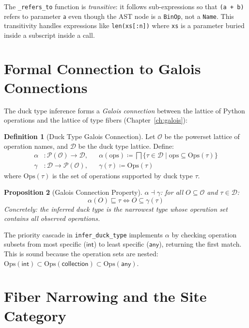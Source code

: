 \documentclass[11pt,a4paper]{report}
\theoremstyle{definition}
\newtheorem{definition}{Definition}[chapter]
\theoremstyle{plain}
\newtheorem{proposition}[definition]{Proposition}
\begin{document}
The \texttt{\_refers\_to} function is \emph{transitive}: it follows
sub-expressions so that \texttt{(a + b)} refers to parameter
$\mathsf{a}$ even though the AST node is a \texttt{BinOp}, not a
\texttt{Name}.  This transitivity handles expressions like
\texttt{len(xs[:n])} where \texttt{xs} is a parameter buried inside
a subscript inside a call.

\section{Formal Connection to Galois Connections}

The duck type inference forms a \emph{Galois connection} between the
lattice of Python operations and the lattice of type fibers
(Chapter~\ref{ch:galois}):

\begin{definition}[Duck Type Galois Connection]
Let $\mathcal{O}$ be the powerset lattice of operation names, and
$\mathcal{D}$ be the duck type lattice.  Define:
\begin{align}
  \alpha &: \mathcal{P}(\mathcal{O}) \to \mathcal{D},
    && \alpha(\mathrm{ops}) \coloneqq
    \bigsqcap \{\tau \in \mathcal{D} \mid \mathrm{ops}
    \subseteq \mathrm{Ops}(\tau)\} \\
  \gamma &: \mathcal{D} \to \mathcal{P}(\mathcal{O}),
    && \gamma(\tau) \coloneqq \mathrm{Ops}(\tau)
\end{align}
where $\mathrm{Ops}(\tau)$ is the set of operations supported by
duck type $\tau$.
\end{definition}

\begin{proposition}[Galois Connection Property]
$\alpha \dashv \gamma$: for all $O \subseteq \mathcal{O}$ and
$\tau \in \mathcal{D}$:
\[
  \alpha(O) \sqsubseteq \tau \iff O \subseteq \gamma(\tau)
\]
Concretely: the inferred duck type is the narrowest type whose
operation set contains all observed operations.
\end{proposition}

The priority cascade in \texttt{infer\_duck\_type} implements
$\alpha$ by checking operation subsets from most specific
($\mathsf{int}$) to least specific ($\mathsf{any}$), returning
the first match.  This is sound because the operation sets are
nested: $\mathrm{Ops}(\mathsf{int}) \subset
\mathrm{Ops}(\mathsf{collection}) \subset \mathrm{Ops}(\mathsf{any})$.

\section{Fiber Narrowing and the Site Category}
\end{document}
